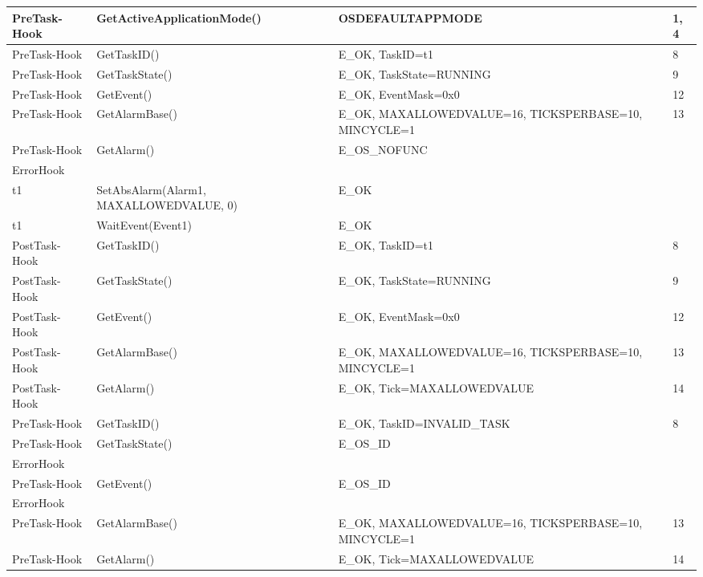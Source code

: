 \documentclass[10pt]{article}
\newlength{\Li}\settowidth{\Li}{Running}
\newlength{\Lii}\setlength{\Lii}{7cm}
\newlength{\Liiii}\setlength{\Liiii}{0.9cm}
\newlength{\Liii}\setlength{\Liii}{\textwidth} \addtolength{\Liii}{-\Li} \addtolength{\Liii}{-\Lii} \addtolength{\Liii}{-\Liiii}
\begin{document}
	\begin{supertabular}{|p{\Li}|p{\Lii}|p{\Liii}|p{\Liiii}|} \hline 
	PreTask-Hook		& GetActiveApplicationMode()			& OSDEFAULTAPPMODE			& 1, 4 \\ \hline
	PreTask-Hook		& GetTaskID()						& E\_OK, TaskID=t1				& 8 \\ \hline	
	PreTask-Hook		& GetTaskState()					& E\_OK, TaskState=RUNNING		& 9 \\ \hline	
	PreTask-Hook		& GetEvent()						& E\_OK, EventMask=0x0				& 12 \\ \hline	
	PreTask-Hook		& GetAlarmBase()					& E\_OK, MAXALLOWEDVALUE=16, TICKSPERBASE=10, MINCYCLE=1							& 13 \\ \hline
	PreTask-Hook		& GetAlarm()						& E\_OS\_NOFUNC					& \\ \hline	
	ErrorHook			& 								& 								& \\ \hline
	
	t1			& SetAbsAlarm(Alarm1, MAXALLOWEDVALUE, 0)	& E\_OK					& \\ \hline	
	t1			& WaitEvent(Event1)						& E\_OK							& \\ \hline
	
	PostTask-Hook		& GetTaskID()						& E\_OK, TaskID=t1				& 8 \\ \hline	
	PostTask-Hook		& GetTaskState()					& E\_OK, TaskState=RUNNING			& 9 \\ \hline	
	PostTask-Hook		& GetEvent()						& E\_OK, EventMask=0x0				& 12 \\ \hline	
	PostTask-Hook		& GetAlarmBase()					& E\_OK, MAXALLOWEDVALUE=16, TICKSPERBASE=10, MINCYCLE=1							& 13 \\ \hline
	PostTask-Hook		& GetAlarm()						& E\_OK, Tick=MAXALLOWEDVALUE	& 14 \\ \hline	
	
	PreTask-Hook		& GetTaskID()						& E\_OK, TaskID=INVALID\_TASK		& 8 \\ \hline	
	PreTask-Hook		& GetTaskState()					& E\_OS\_ID						& \\ \hline	
	ErrorHook			& 								& 								& \\ \hline
	PreTask-Hook		& GetEvent()						& E\_OS\_ID						& \\ \hline	
	ErrorHook			& 								& 								& \\ \hline
	PreTask-Hook		& GetAlarmBase()					& E\_OK, MAXALLOWEDVALUE=16, TICKSPERBASE=10, MINCYCLE=1							& 13 \\ \hline
	PreTask-Hook		& GetAlarm()						& E\_OK, Tick=MAXALLOWEDVALUE	& 14 \\ \hline	
	

\end{supertabular}
\end{document}
